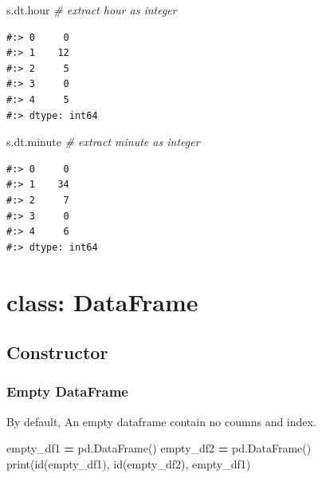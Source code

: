 \documentclass[
]{book}
\newenvironment{Shaded}{\begin{snugshade}}{\end{snugshade}}
\newcommand{\BuiltInTok}[1]{#1}
\newcommand{\CommentTok}[1]{\textcolor[rgb]{0.37,0.37,0.37}{\textit{#1}}}
\newcommand{\NormalTok}[1]{#1}
\newcommand{\OperatorTok}[1]{\textcolor[rgb]{0.43,0.43,0.43}{\textbf{#1}}}
\begin{document}
\begin{Shaded}
\begin{Highlighting}[]
\NormalTok{s.dt.hour  }\CommentTok{# extract hour as integer}
\end{Highlighting}
\end{Shaded}

\begin{verbatim}
#:> 0     0
#:> 1    12
#:> 2     5
#:> 3     0
#:> 4     5
#:> dtype: int64
\end{verbatim}

\begin{Shaded}
\begin{Highlighting}[]
\NormalTok{s.dt.minute }\CommentTok{# extract minute as integer}
\end{Highlighting}
\end{Shaded}

\begin{verbatim}
#:> 0     0
#:> 1    34
#:> 2     7
#:> 3     0
#:> 4     6
#:> dtype: int64
\end{verbatim}

\hypertarget{class-dataframe}{%
\section{class: DataFrame}\label{class-dataframe}}

\hypertarget{constructor-10}{%
\subsection{Constructor}\label{constructor-10}}

\hypertarget{empty-dataframe}{%
\subsubsection{Empty DataFrame}\label{empty-dataframe}}

By default, An empty dataframe contain no coumns and index.

\begin{Shaded}
\begin{Highlighting}[]
\NormalTok{empty_df1 }\OperatorTok{=}\NormalTok{ pd.DataFrame()}
\NormalTok{empty_df2 }\OperatorTok{=}\NormalTok{ pd.DataFrame()}
\BuiltInTok{print}\NormalTok{(}\BuiltInTok{id}\NormalTok{(empty_df1), }\BuiltInTok{id}\NormalTok{(empty_df2), empty_df1)}
\end{Highlighting}
\end{Shaded}
\end{document}
